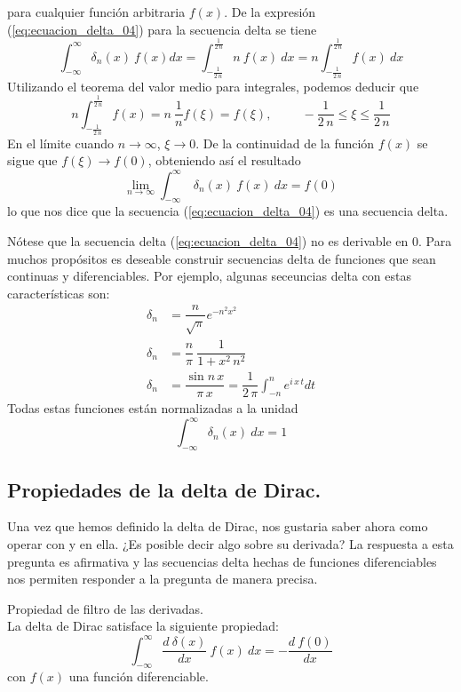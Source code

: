 para cualquier función arbitraria $f(x)$. De la expresión (\ref{eq:ecuacion_delta_04}) para la secuencia delta se tiene
\[ \int_{-\infty}^{\infty} \delta_{n} (x) \: f(x) dx = \int_{-\frac{1}{2 \, n}}^{\frac{1}{2 \, n}} n \: f(x) \: dx = n \int_{-\frac{1}{2 \, n}}^{\frac{1}{2 \, n}} f(x) \:  dx \]
Utilizando el teorema del valor medio para integrales, podemos deducir que
\[ n \int_{-\frac{1}{2 \, n}}^{\frac{1}{2 \, n}} f(x) = n \: \dfrac{1}{n} f(\xi) = f(\xi), \hspace{1cm} - \dfrac{1}{2 \, n} \leq \xi \leq \dfrac{1}{2 \, n} \]
En el límite cuando $n \to \infty$, $\xi \to 0$. De la continuidad de la función $f(x)$ se sigue que $f(\xi) \to f(0)$, obteniendo así el resultado
\[ \lim_{n \to \infty} \int_{-\infty}^{\infty} \: \delta_{n}(x) \: f(x) \: dx = f(0) \]
lo que nos dice que la secuencia (\ref{eq:ecuacion_delta_04}) es una secuencia delta.
\par
Nótese que la secuencia delta (\ref{eq:ecuacion_delta_04}) no es derivable en $0$. Para muchos propósitos es deseable
construir secuencias delta de funciones que sean continuas y diferenciables. Por ejemplo, algunas seceuncias delta con estas características son:
\begin{align*}
\delta_{n} &= \dfrac{n}{\sqrt{\pi}} e^{-n^{2} x^{2}} \\
\delta_{n} &= \dfrac{n}{\pi} \: \dfrac{1}{1 + x^{2} \, n^{2}} \\
\delta_{n} &= \dfrac{\sin n \, x}{\pi \, x} = \dfrac{1}{2 \, \pi} \int_{-n}^{n} e^{i \, x \, t} dt
\end{align*}
Todas estas funciones están normalizadas a la unidad
\begin{equation}
\int_{- \infty}^{\infty} \delta_{n}(x) \: dx = 1
\label{eq:ecuacion_delta_05}
\end{equation}
\subsection{Propiedades de la delta de Dirac.}
Una vez que hemos definido la delta de Dirac, nos gustaria saber ahora como operar con y en ella. ¿Es posible decir algo sobre su derivada? La respuesta a esta pregunta es afirmativa y las secuencias delta hechas de funciones diferenciables nos permiten responder a la pregunta de manera precisa.
\begin{propiedad}
Propiedad de filtro de las derivadas.
\\
La delta de Dirac satisface la siguiente propiedad:
\[ \int_{-\infty}^{\infty} \dfrac{d \: \delta(x)}{dx} \: f(x)  \: dx = - \dfrac{d \: f(0)}{dx} \]
con $f(x)$ una función diferenciable.
\end{propiedad}

